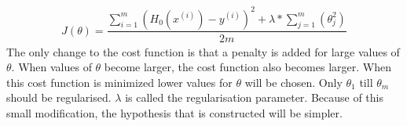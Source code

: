 \begin{align}
J(\theta) = \dfrac{\sum\limits_{i=1}^m(H_0(x^{(i)}) - y^{(i)})^2 + \lambda * \sum\limits_{j=1}^m(\theta_j^2)}{2m}
\end{align}
The only change to the cost function is that a penalty is added for large values of $\theta$. When values of $\theta$ become larger, the cost function also becomes larger. When this cost function is minimized lower values for $\theta$ will be chosen. Only $\theta_1$ till $\theta_m$ should be regularised. $\lambda$ is called the regularisation parameter. Because of this small modification, the hypothesis that is constructed will be simpler.



